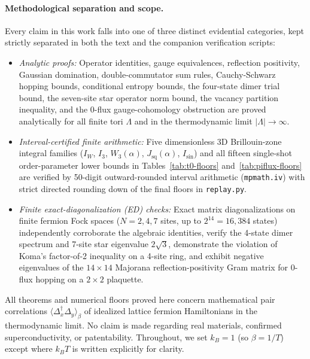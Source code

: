 \documentclass[11pt]{article}
\theoremstyle{definition}
\theoremstyle{remark}
\begin{document}
\paragraph{Methodological separation and scope.}
Every claim in this work falls into one of three distinct evidential categories, kept strictly separated in both the text and the companion verification scripts:
\begin{itemize}[leftmargin=2em]
\item \emph{Analytic proofs:} Operator identities, gauge equivalences, reflection positivity, Gaussian domination, double-commutator sum rules, Cauchy-Schwarz hopping bounds, conditional entropy bounds, the four-state dimer trial bound, the seven-site star operator norm bound, the vacancy partition inequality, and the $0$-flux gauge-cohomology obstruction are proved analytically for all finite tori $\Lambda$ and in the thermodynamic limit $|\Lambda| \to \infty$.
\item \emph{Interval-certified finite arithmetic:} Five dimensionless 3D Brillouin-zone integral families ($I_W$, $I_3$, $W_3(\alpha)$, $J_{\mathrm{sq}}(\alpha)$, $I_{\sin}$) and all fifteen single-shot order-parameter lower bounds in Tables~\ref{tab:t0-floors} and~\ref{tab:piflux-floors} are verified by 50-digit outward-rounded interval arithmetic (\texttt{mpmath.iv}) with strict directed rounding down of the final floors in \texttt{replay.py}.
\item \emph{Finite exact-diagonalization (ED) checks:} Exact matrix diagonalizations on finite fermion Fock spaces ($N = 2, 4, 7$ sites, up to $2^{14} = 16{,}384$ states) independently corroborate the algebraic identities, verify the 4-state dimer spectrum and 7-site star eigenvalue $2\sqrt{3}$, demonstrate the violation of Koma's factor-of-2 inequality on a 4-site ring, and exhibit negative eigenvalues of the $14 \times 14$ Majorana reflection-positivity Gram matrix for $0$-flux hopping on a $2 \times 2$ plaquette.
\end{itemize}
All theorems and numerical floors proved here concern mathematical pair correlations $\langle \Delta_x^\dagger \Delta_y \rangle_\beta$ of idealized lattice fermion Hamiltonians in the thermodynamic limit. No claim is made regarding real materials, confirmed superconductivity, or patentability. Throughout, we set $k_B = 1$ (so $\beta = 1/T$) except where $k_B T$ is written explicitly for clarity.
\end{document}
